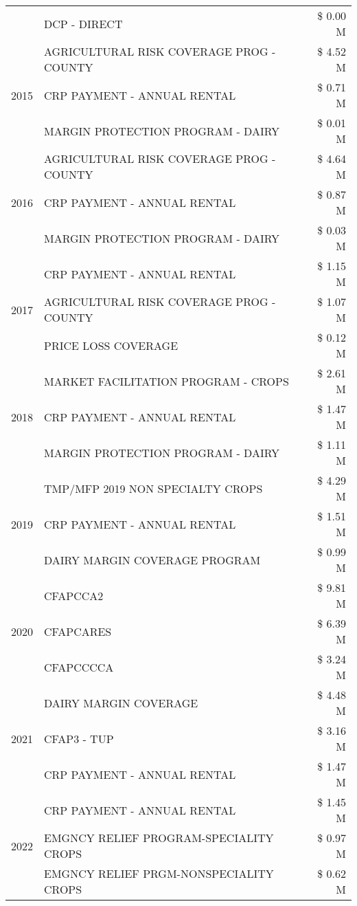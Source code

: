 \begin{tabular}{llr}
 & DCP - DIRECT & \$ 0.00 M \\
\cline{1-3}
\multirow[t]{3}{*}{2015} & AGRICULTURAL RISK COVERAGE PROG - COUNTY & \$ 4.52 M \\
 & CRP PAYMENT - ANNUAL RENTAL & \$ 0.71 M \\
 & MARGIN PROTECTION PROGRAM - DAIRY & \$ 0.01 M \\
\cline{1-3}
\multirow[t]{3}{*}{2016} & AGRICULTURAL RISK COVERAGE PROG - COUNTY & \$ 4.64 M \\
 & CRP PAYMENT - ANNUAL RENTAL & \$ 0.87 M \\
 & MARGIN PROTECTION PROGRAM - DAIRY & \$ 0.03 M \\
\cline{1-3}
\multirow[t]{3}{*}{2017} & CRP PAYMENT - ANNUAL RENTAL & \$ 1.15 M \\
 & AGRICULTURAL RISK COVERAGE PROG - COUNTY & \$ 1.07 M \\
 & PRICE LOSS COVERAGE & \$ 0.12 M \\
\cline{1-3}
\multirow[t]{3}{*}{2018} & MARKET FACILITATION PROGRAM - CROPS & \$ 2.61 M \\
 & CRP PAYMENT - ANNUAL RENTAL & \$ 1.47 M \\
 & MARGIN PROTECTION PROGRAM - DAIRY & \$ 1.11 M \\
\cline{1-3}
\multirow[t]{3}{*}{2019} & TMP/MFP 2019 NON SPECIALTY CROPS & \$ 4.29 M \\
 & CRP PAYMENT - ANNUAL RENTAL & \$ 1.51 M \\
 & DAIRY MARGIN COVERAGE PROGRAM & \$ 0.99 M \\
\cline{1-3}
\multirow[t]{3}{*}{2020} & CFAPCCA2 & \$ 9.81 M \\
 & CFAPCARES & \$ 6.39 M \\
 & CFAPCCCCA & \$ 3.24 M \\
\cline{1-3}
\multirow[t]{3}{*}{2021} & DAIRY MARGIN COVERAGE & \$ 4.48 M \\
 & CFAP3 - TUP & \$ 3.16 M \\
 & CRP PAYMENT - ANNUAL RENTAL & \$ 1.47 M \\
\cline{1-3}
\multirow[t]{3}{*}{2022} & CRP PAYMENT - ANNUAL RENTAL & \$ 1.45 M \\
 & EMGNCY RELIEF PROGRAM-SPECIALITY CROPS & \$ 0.97 M \\
 & EMGNCY RELIEF PRGM-NONSPECIALITY CROPS & \$ 0.62 M \\
\cline{1-3}
\bottomrule
\end{tabular}
